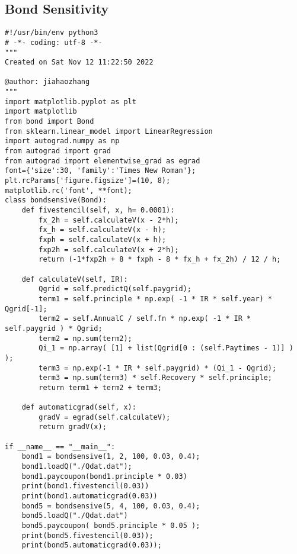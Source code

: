 \documentclass[a4paper,11pt]{article} %
\begin{document}
\subsection{Bond Sensitivity}
\begin{lstlisting}
#!/usr/bin/env python3
# -*- coding: utf-8 -*-
"""
Created on Sat Nov 12 11:22:50 2022

@author: jiahaozhang
"""
import matplotlib.pyplot as plt
import matplotlib
from bond import Bond
from sklearn.linear_model import LinearRegression
import autograd.numpy as np
from autograd import grad
from autograd import elementwise_grad as egrad
font={'size':30, 'family':'Times New Roman'};
plt.rcParams['figure.figsize']=(10, 8);
matplotlib.rc('font', **font);
class bondsensive(Bond):
    def fivestencil(self, x, h= 0.0001):
        fx_2h = self.calculateV(x - 2*h);
        fx_h = self.calculateV(x - h);
        fxph = self.calculateV(x + h);
        fxp2h = self.calculateV(x + 2*h);
        return (-1*fxp2h + 8 * fxph - 8 * fx_h + fx_2h) / 12 / h;

    def calculateV(self, IR):
        Qgrid = self.predictQ(self.paygrid);
        term1 = self.principle * np.exp( -1 * IR * self.year) * Qgrid[-1];
        term2 = self.AnnualC / self.fn * np.exp( -1 * IR * self.paygrid ) * Qgrid;
        term2 = np.sum(term2);
        Qi_1 = np.array( [1] + list(Qgrid[0 : (self.Paytimes - 1)] ) );
        term3 = np.exp(-1 * IR * self.paygrid) * (Qi_1 - Qgrid);
        term3 = np.sum(term3) * self.Recovery * self.principle;
        return term1 + term2 + term3;

    def automaticgrad(self, x):
        gradV = egrad(self.calculateV);
        return gradV(x);

if __name__ == "__main__":
    bond1 = bondsensive(1, 2, 100, 0.03, 0.4);
    bond1.loadQ("./Qdat.dat");
    bond1.paycoupon(bond1.principle * 0.03)
    print(bond1.fivestencil(0.03))
    print(bond1.automaticgrad(0.03))
    bond5 = bondsensive(5, 4, 100, 0.03, 0.4);
    bond5.loadQ("./Qdat.dat")
    bond5.paycoupon( bond5.principle * 0.05 );
    print(bond5.fivestencil(0.03));
    print(bond5.automaticgrad(0.03));
\end{lstlisting}
\end{document}
